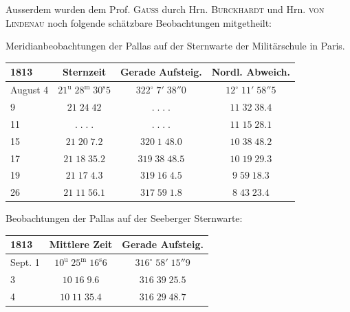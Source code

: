 \par\indent Ausserdem wurden dem Prof. \textsc{Gauss} durch Hrn. \textsc{Burckhardt} und Hrn.
\textsc{von Lindenau} noch folgende schätzbare Beobachtungen mitgetheilt:

\begin{center}Meridianbeobachtungen der Pallas auf der Sternwarte der Militärschule in Paris.\end{center}
\begin{center}\fontsize{10}{12}\selectfont\setlength{\tabcolsep}{5pt}\renewcommand{\arraystretch}{1.15}\begin{tabular}{l|c|c|c}
1813 & Sternzeit & Gerade Aufsteig. & Nordl. Abweich.\\\hline
August 4 & $21^{\mathrm u}\;28^{\mathrm m}\;30^{\mathrm s}5$ & $322^\circ\;7'\;38''0$ & $12^\circ\;11'\;58''5$\\
9 & $21\;24\;42$ & $.\;.\;.\;.$ & $11\;32\;38.4$\\
11 & $.\;.\;.\;.$ & $.\;.\;.\;.$ & $11\;15\;28.1$\\
15 & $21\;20\;7.2$ & $320\;1\;48.0$ & $10\;38\;48.2$\\
17 & $21\;18\;35.2$ & $319\;38\;48.5$ & $10\;19\;29.3$\\
19 & $21\;17\;4.3$ & $319\;16\;4.5$ & $9\;59\;18.3$\\
26 & $21\;11\;56.1$ & $317\;59\;1.8$ & $8\;43\;23.4$\\
\end{tabular}\end{center}

\begin{center}\leavevmode{}Beobachtungen der Pallas auf der Seeberger Sternwarte:\end{center}

\begin{center}\fontsize{10}{12}\selectfont\setlength{\tabcolsep}{5pt}\renewcommand{\arraystretch}{1.15}\begin{tabular}{l|c|c}
1813 & Mittlere Zeit & Gerade Aufsteig.\\\hline
Sept. 1 & $10^{\mathrm u}\;25^{\mathrm m}\;16^{\mathrm s}6$ & $316^\circ\;58'\;15''9$\\
3 & $10\;16\;9.6$ & $316\;39\;25.5$\\
4 & $10\;11\;35.4$ & $316\;29\;48.7$\\
\end{tabular}\end{center}


